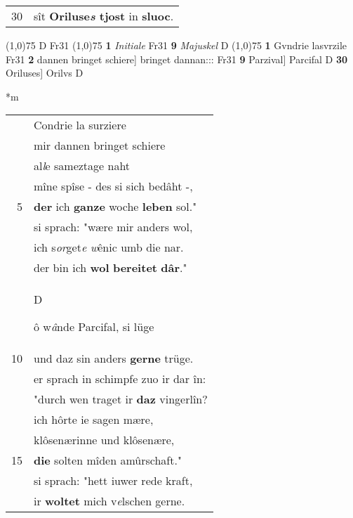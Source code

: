 \documentclass[8pt,a4paper,notitlepage]{article}
\begin{document}
\begin{table}[ht]
\begin{minipage}[t]{0.5\linewidth}
\begin{tabular}{rl}
30 & sît \textbf{Oriluse\textit{s} tjost} in \textbf{sluoc}.\\ 
\end{tabular}
\scriptsize
\line(1,0){75} \newline
D Fr31 \newline
\line(1,0){75} \newline
\textbf{1} \textit{Initiale} Fr31  \textbf{9} \textit{Majuskel} D  \newline
\line(1,0){75} \newline
\textbf{1} Gvndrie lasvrzile Fr31 \textbf{2} dannen bringet schiere] bringet dannan::: Fr31 \textbf{9} Parzival] Parcifal D \textbf{30} Oriluses] Orilvs D \newline
\end{minipage}
\hspace{0.5cm}
\begin{minipage}[t]{0.5\linewidth}
\small
\begin{center}*m
\end{center}
\begin{tabular}{rl}
 & Condrie la surziere\\ 
 & mir dannen bringet schiere\\ 
 & al\textit{l}e sameztage  naht\\ 
 & mîne spîse - des  si sich bedâht -,\\ 
5 & \textbf{der} ich \textbf{ganze} woche \textbf{leben} sol."\\ 
 & si sprach: "wære mir anders wol,\\ 
 & ich s\textit{or}get\textit{e} \textit{w}ênic umb die nar.\\ 
 & der bin ich \textbf{wol} \textbf{bereitet} \textbf{dâr}."\\ 
 & \begin{large}D\end{large}ô w\textit{â}nde Parcifal, si lüge\\ 
10 & und daz sin anders \textbf{gerne} trüge.\\ 
 & er sprach in schimpfe zuo ir dar în:\\ 
 & "durch wen traget ir \textbf{daz} vingerlîn?\\ 
 & ich hôrte ie sagen mære,\\ 
 & klôsenærinne und klôsenære,\\ 
15 & \textbf{die} solten mîden amûrschaft."\\ 
 & si sprach: "hett iuwer rede kraft,\\ 
 & ir \textbf{woltet} mich v\textit{e}lschen gerne.\\ 

\end{tabular}
\end{minipage}
\end{table}
\end{document}
